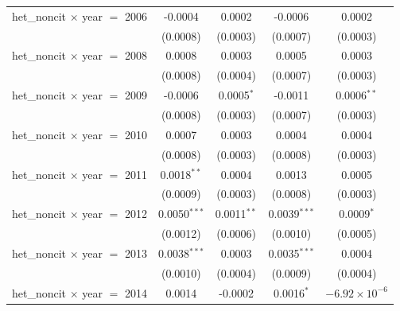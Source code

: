 \begin{tabular}{lcccc}
   het\_noncit $\times$ year $=$ 2006               & -0.0004            & 0.0002                    & -0.0006              & 0.0002\\   
                                                    & (0.0008)           & (0.0003)                  & (0.0007)             & (0.0003)\\   
   het\_noncit $\times$ year $=$ 2008               & 0.0008             & 0.0003                    & 0.0005               & 0.0003\\   
                                                    & (0.0008)           & (0.0004)                  & (0.0007)             & (0.0003)\\   
   het\_noncit $\times$ year $=$ 2009               & -0.0006            & 0.0005$^{*}$              & -0.0011              & 0.0006$^{**}$\\   
                                                    & (0.0008)           & (0.0003)                  & (0.0007)             & (0.0003)\\   
   het\_noncit $\times$ year $=$ 2010               & 0.0007             & 0.0003                    & 0.0004               & 0.0004\\   
                                                    & (0.0008)           & (0.0003)                  & (0.0008)             & (0.0003)\\   
   het\_noncit $\times$ year $=$ 2011               & 0.0018$^{**}$      & 0.0004                    & 0.0013               & 0.0005\\   
                                                    & (0.0009)           & (0.0003)                  & (0.0008)             & (0.0003)\\   
   het\_noncit $\times$ year $=$ 2012               & 0.0050$^{***}$     & 0.0011$^{**}$             & 0.0039$^{***}$       & 0.0009$^{*}$\\   
                                                    & (0.0012)           & (0.0006)                  & (0.0010)             & (0.0005)\\   
   het\_noncit $\times$ year $=$ 2013               & 0.0038$^{***}$     & 0.0003                    & 0.0035$^{***}$       & 0.0004\\   
                                                    & (0.0010)           & (0.0004)                  & (0.0009)             & (0.0004)\\   
   het\_noncit $\times$ year $=$ 2014               & 0.0014             & -0.0002                   & 0.0016$^{*}$         & $-6.92\times 10^{-6}$\\    

\end{tabular}
